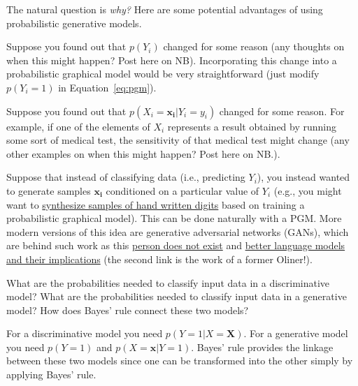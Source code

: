 \documentclass[assignment03_Solutions]{subfiles}
\begin{document}
The natural question is \emph{why?} Here are some potential advantages of using probabilistic generative models.
\bi
\item Suppose you found out that $p(Y_i)$ changed for some reason (any thoughts on when this might happen?  Post here on NB).  Incorporating this change into a probabilistic graphical model would be very straightforward (just modify $p(Y_i =1)$ in Equation~\ref{eq:pgm}).
\item Suppose you found out that $p(X_i  = \mathbf{x_i} | Y_i = y_i)$ changed for some reason.  For example, if one of the elements of $X_i$ represents a result obtained by running some sort of medical test, the sensitivity of that medical test might change (any other examples on when this might happen? Post here on NB.).
\item Suppose that instead of classifying data (i.e., predicting $Y_i$), you instead wanted to generate samples $\mathbf{x_i}$ conditioned on a particular value of $Y_i$ (e.g., you might want to \href{https://www.youtube.com/watch?v=LzE1fF0_3q0}{synthesize samples of hand written digits} based on training a probabilistic graphical model).  This can be done naturally with a PGM.  More modern versions of this idea are generative adversarial networks (GANs), which are behind such work as this \href{https://thispersondoesnotexist.com/}{person does not exist} and \href{https://openai.com/blog/better-language-models/}{better language models and their implications} (the second link is the work of a former Oliner!).
\ei

\begin{understandingcheck}
What are the probabilities needed to classify input data in a discriminative model?  What are the probabilities needed to classify input data in a generative model?  How does Bayes' rule connect these two models?

\begin{boxedsolution}
For a discriminative model you need $p(Y=1 | X = \mathbf{X})$.  For a generative model you need $p(Y=1)$ and $p(X = \mathbf{x} | Y=1)$.  Bayes' rule provides the linkage between these two models since one can be transformed into the other simply by applying Bayes' rule.
\end{boxedsolution}
\end{understandingcheck}
\end{document}
